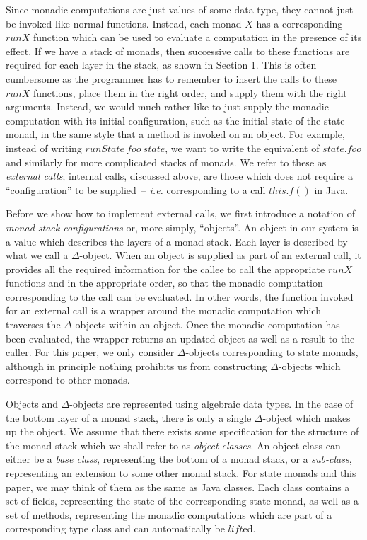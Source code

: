 Since monadic computations are just values of some data type, they cannot just be invoked like normal functions. Instead, each monad $X$ has a corresponding $\mathit{runX}$ function which can be used to evaluate a computation in the presence of its effect. If we have a stack of monads, then successive calls to these functions are required for each layer in the stack, as shown in Section 1. This is often cumbersome as the programmer has to remember to insert the calls to these $\mathit{runX}$ functions, place them in the right order, and supply them with the right arguments. Instead, we would much rather like to just supply the monadic computation with its initial configuration, such as the initial state of the state monad, in the same style that a method is invoked on an object. For example, instead of writing $\mathit{runState}~\mathit{foo}~\mathit{state}$, we want to write the equivalent of $\mathit{state}.\mathit{foo}$ and similarly for more complicated stacks of monads.
We refer to these as \emph{external calls}; internal calls, discussed above,
are those which does not require a ``configuration'' to be supplied~-- \emph{i.e.} corresponding to a call $\mathit{this}.f()$ in Java. 

Before we show how to implement external calls, we first introduce a notation of \emph{monad stack configurations} or, more simply, ``objects''.
%
An object in our system is a value which describes the layers of a monad stack. Each layer is described by what we call a $\Delta$-object. When an object is supplied as part of an external call, it provides all the required information for the callee to call the appropriate $\mathit{runX}$ functions and in the appropriate order, so that the monadic computation corresponding to the call can be evaluated. In other words, the function invoked for an external call is a wrapper around the monadic computation which traverses the $\Delta$-objects within an object. Once the monadic computation has been evaluated, the wrapper returns an updated object as well as a result to the caller. For this paper, we only consider $\Delta$-objects corresponding to state monads, although in principle nothing prohibits us from constructing $\Delta$-objects which correspond to other monads.

Objects and $\Delta$-objects are represented using algebraic data types. In the case of the bottom layer of a monad stack, there is only a single $\Delta$-object which makes up the object. We assume that there exists some specification for the structure of the monad stack which we shall refer to as \emph{object classes}. An object class can either be a \emph{base class}, representing the bottom of a monad stack, or a \emph{sub-class}, representing an extension to some other monad stack. For state monads and this paper, we may think of them as the same as Java classes. Each class contains a set of fields, representing the state of the corresponding state monad, as well as a set of methods, representing the monadic computations which are part of a corresponding type class and can automatically be $\mathit{lift}$ed. 

